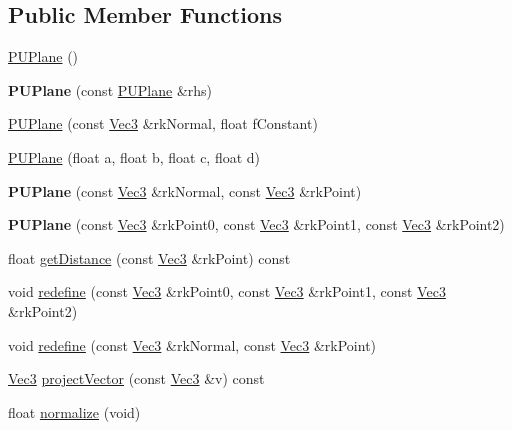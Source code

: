 \subsection*{Public Member Functions}
\begin{DoxyCompactItemize}
\item 
\hyperlink{classPUPlane_a13f5ef6354af2739872b4c3ebae4f1b9}{P\+U\+Plane} ()
\item 
\mbox{\label{classPUPlane_a89894825c77c17439344cbf3ca617296}} 
{\bfseries P\+U\+Plane} (const \hyperlink{classPUPlane}{P\+U\+Plane} \&rhs)
\item 
\hyperlink{classPUPlane_a58477f1c39a22c2c6feddb85c1559544}{P\+U\+Plane} (const \hyperlink{classVec3}{Vec3} \&rk\+Normal, float f\+Constant)
\item 
\hyperlink{classPUPlane_af65211380d976874fee10f0ed0122535}{P\+U\+Plane} (float a, float b, float c, float d)
\item 
\mbox{\label{classPUPlane_aa8db8fdce9fd121ab5c4941c26b495db}} 
{\bfseries P\+U\+Plane} (const \hyperlink{classVec3}{Vec3} \&rk\+Normal, const \hyperlink{classVec3}{Vec3} \&rk\+Point)
\item 
\mbox{\label{classPUPlane_a6328c70b570e570477bb997e8c346500}} 
{\bfseries P\+U\+Plane} (const \hyperlink{classVec3}{Vec3} \&rk\+Point0, const \hyperlink{classVec3}{Vec3} \&rk\+Point1, const \hyperlink{classVec3}{Vec3} \&rk\+Point2)
\item 
float \hyperlink{classPUPlane_a8d46bb12b79dfa18db08e2a59776191e}{get\+Distance} (const \hyperlink{classVec3}{Vec3} \&rk\+Point) const
\item 
void \hyperlink{classPUPlane_ab5f749af7164a88b60533ab92f93456f}{redefine} (const \hyperlink{classVec3}{Vec3} \&rk\+Point0, const \hyperlink{classVec3}{Vec3} \&rk\+Point1, const \hyperlink{classVec3}{Vec3} \&rk\+Point2)
\item 
void \hyperlink{classPUPlane_a28e4eb42319176fc722d461c7bbf882b}{redefine} (const \hyperlink{classVec3}{Vec3} \&rk\+Normal, const \hyperlink{classVec3}{Vec3} \&rk\+Point)
\item 
\hyperlink{classVec3}{Vec3} \hyperlink{classPUPlane_a7e389950f054b35612eeb8d03651fffe}{project\+Vector} (const \hyperlink{classVec3}{Vec3} \&v) const
\item 
float \hyperlink{classPUPlane_a3fdd7310db1b718bc70fe3cac8714f2e}{normalize} (void)
\item 

\end{DoxyCompactItemize}
